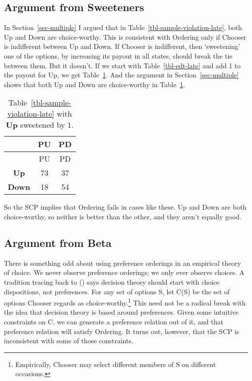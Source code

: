 \documentclass[
  10pt,
  letterpaper,
  DIV=11,
  numbers=noendperiod,
  twoside]{scrartcl}
\begin{document}
\subsection{Argument from Sweeteners}\label{sec-sweeteners}

In Section~\ref{sec-multiple} I argued that in
Table~\ref{tbl-sample-violation-late}, both Up and Down are
choice-worthy. This is consistent with Ordering only if Chooser is
indifferent between Up and Down. If Chooser is indifferent, then
`sweetening' one of the options, by increasing its payout in all states,
should break the tie between them. But it doesn't. If we start with
Table~\ref{tbl-edt-late} and add 1 to the payout for Up, we get
Table~\ref{tbl-sweetened}. And the argument in
Section~\ref{sec-multiple} shows that both Up and Down are choice-worthy
in Table~\ref{tbl-sweetened}.

\begin{longtable}[]{@{}ccc@{}}
\caption{Table~\ref{tbl-sample-violation-late} with \textbf{Up}
sweetened by 1.}\label{tbl-sweetened}\tabularnewline
\toprule\noalign{}
& PU & PD \\
\midrule\noalign{}
\endfirsthead
\toprule\noalign{}
& PU & PD \\
\midrule\noalign{}
\endhead
\bottomrule\noalign{}
\endlastfoot
\textbf{Up} & 73 & 37 \\
\textbf{Down} & 18 & 54 \\
\end{longtable}

So the SCP implies that Ordering fails in cases like these. Up and Down
are both choice-worthy, so neither is better than the other, and they
aren't equally good.

\subsection{Argument from Beta}\label{sec-beta}

There is something odd about using preference orderings in an empirical
theory of choice. We never observe preference orderings; we only ever
observe choices. A tradition tracing back to
() says decision
theory should start with choice dispositions, not preferences. For any
set of options S, let C(S) be the set of options Chooser regards as
choice-worthy.\footnote{Empirically, Chooser may select different
  members of S on different occasions.} This need not be a radical break
with the idea that decision theory is based around preferences. Given
some intuitive constraints on C, we can generate a preference relation
out of it, and that preference relation will satisfy Ordering. It turns
out, however, that the SCP is inconsistent with some of those
constraints.
\end{document}
